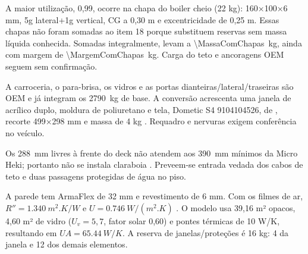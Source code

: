\documentclass[12pt,a4paper]{article}
\newcommand{\itemmark}[1]{\label{item:#1}}
\begin{document}
A maior utilização, 0,99, ocorre na chapa do boiler cheio (22 kg): 160×100×6 mm,
5g lateral+1g vertical, CG a 0,30 m e excentricidade de 0,25 m.
Essas chapas não foram somadas ao item 18 porque substituem reservas sem massa líquida
conhecida. Somadas integralmente, levam a \SI{\MassaComChapas}{kg}, ainda com margem
de \SI{\MargemComChapas}{kg}. Carga do teto e ancoragens OEM seguem sem confirmação.

\itemmark{16}
A carroceria, o para-brisa, os vidros e as portas dianteiras/lateral/traseiras são OEM
e já integram os \SI{2790}{kg} de base. A conversão acrescenta uma janela de acrílico duplo, moldura de poliuretano e tela, Dometic S4
9104104526, de , recorte 499×298 mm e massa de 4 kg \cite{janelaS4}.
Requadro e nervuras exigem conferência no veículo.

Os \SI{288}{mm} livres à frente do deck não atendem aos \SI{390}{mm} mínimos da Micro
Heki; portanto não se instala claraboia \cite{microheki,microespaco}. Preveem-se entrada
vedada dos cabos de teto e duas passagens protegidas de água no piso.

A parede tem ArmaFlex de 32 mm e revestimento de 6 mm. Com os filmes de ar,
$R''=\SI{1,340}{m^2.K/W}$ e $U=\SI{0,746}{W/(m^2.K)}$ \cite{armaflex}.
O modelo usa 39,16 m² opacos, 4,60 m² de vidro ($U_v=5{,}7$, fator solar 0,60) e
pontes térmicas de 10 W/K, resultando em $UA=\SI{65,44}{W/K}$.
A reserva de janelas/proteções é 16 kg: 4 da janela e 12 dos demais elementos.
\end{document}
